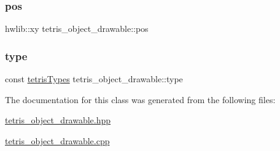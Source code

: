 \subsubsection{\texorpdfstring{pos}{pos}}
{\footnotesize\ttfamily hwlib\+::xy tetris\+\_\+object\+\_\+drawable\+::pos\hspace{0.3cm}{\ttfamily [protected]}}

\mbox{\label{classtetris__object__drawable_a340ea25384078c922b226a9edd5a7eba}} 
\subsubsection{\texorpdfstring{type}{type}}
{\footnotesize\ttfamily const \hyperlink{enums_8hpp_aa2b983d3f5fee7f17796e5ef5040d787}{tetris\+Types} tetris\+\_\+object\+\_\+drawable\+::type\hspace{0.3cm}{\ttfamily [protected]}}



The documentation for this class was generated from the following files\+:\begin{DoxyCompactItemize}
\item 
\hyperlink{tetris__object__drawable_8hpp}{tetris\+\_\+object\+\_\+drawable.\+hpp}\item 
\hyperlink{tetris__object__drawable_8cpp}{tetris\+\_\+object\+\_\+drawable.\+cpp}\end{DoxyCompactItemize}
